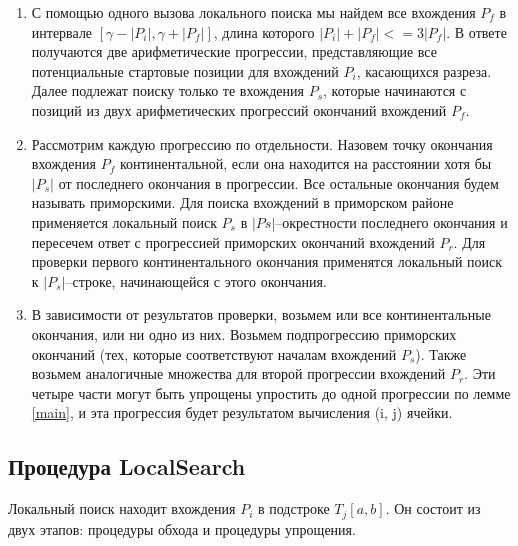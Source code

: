 \documentclass[14pt]{article}
\begin{document}
\begin{enumerate}
\item С помощью одного вызова локального поиска мы найдем все вхождения $P_f$ в интервале $[\gamma - |P_i|, \gamma + |P_f|]$, длина которого $|P_i| + |P_f| <= 3|P_f|$. В ответе получаются две арифметические прогрессии, представляющие все потенциальные стартовые позиции для вхождений $P_i$, касающихся разреза. Далее подлежат поиску только те вхождения $P_s$, которые начинаются с позиций из двух арифметических прогрессий окончаний вхождений $P_f$.
\item Рассмотрим каждую прогрессию по отдельности. Назовем точку окончания вхождения $P_f$ континентальной, если она находится на расстоянии хотя бы $|P_s|$ от последнего окончания в прогрессии. Все остальные окончания будем называть приморскими. Для поиска вхождений в приморском районе применяется локальный поиск $P_s$ в $|Ps|$--окрестности последнего окончания
и пересечем ответ с прогрессией приморских окончаний вхождений $P_r$. Для проверки первого континентального окончания применятся локальный поиск к $|P_s|$--строке, начинающейся с этого окончания.
\item В зависимости от результатов проверки, возьмем или все континентальные окончания, или ни одно из них. Возьмем подпрогрессию приморских окончаний (тех, которые соответствуют началам вхождений $P_s$). Также возьмем аналогичные множества для второй прогрессии вхождений $P_r$. Эти четыре части могут быть упрощены упростить до одной прогрессии по лемме \ref{main}, и эта прогрессия будет результатом вычисления (i, j) ячейки.
\end{enumerate}

\subsection{Процедура LocalSearch}

Локальный поиск находит вхождения $P_i$ в подстроке $T_j[a, b]$. Он состоит из двух этапов: процедуры обхода и процедуры упрощения.
\end{document}
